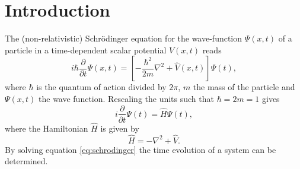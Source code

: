 \section*{Introduction}
The (non-relativistic) Schr\"{o}dinger equation for the wave-function $\Psi(x,t)$ of a particle in a time-dependent scalar potential $V(x,t)$ reads 
\[
i\hbar \frac{\partial}{\partial t}\Psi(x,t) = \left[-\frac{\hbar^2}{2m}\nabla^2+\hat{V}(x,t)\right]\Psi(t),
\]
where $\hbar$ is the quantum of action divided by $2\pi$, $m$ the mass of the particle and $\Psi(x,t)$ the wave function.
Rescaling the units such that $\hbar = 2m = 1$ gives
\begin{equation}\label{eq:schrodinger}
i \frac{\partial}{\partial t}\Psi(t) = \hat{H}\Psi(t),
\end{equation}where the Hamiltonian $\hat{H}$ is given by
\[
\hat{H} = -\nabla^2+\hat{V}.
\] By solving equation \ref{eq:schrodinger} the time evolution of a system can be determined.